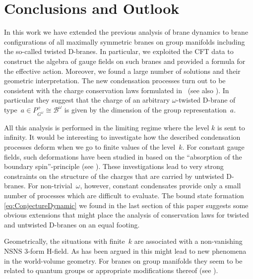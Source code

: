\documentclass[12pt,a4paper]{article}
\newcommand{\mc}{\mathcal} %
\def\iG{G^\omega} %
\def\bL{\mc{B}} %
\def\reps{P^+} %
\def\treps{\bL^\omega} %
\begin{document}
\section{Conclusions and Outlook}

In this work we have extended the previous analysis of brane 
dynamics \cite{Alekseev:1999bs,Alekseev:2000fd,Alekseev:2000wg} 
to brane configurations of all maximally symmetric branes on 
group manifolds including the so-called twisted D-branes. In 
particular, we exploited the CFT data to construct the algebra 
of gauge fields on such branes and provided a formula for the 
effective action. Moreover, we found a large number of solutions 
and their geometric interpretation. The new condensation processes 
turn out to be consistent with the charge conservation laws 
formulated in~\cite{Fredenhagen:2000ei} (see also 
\cite{Maldacena:2001xj}). In particular they suggest that the charge 
of an arbitrary $\omega$-twisted D-brane of type~$a\in\reps_{\iG}
\cong\treps$ is given by the dimension of the group 
representation~$a$.
\medskip 

All this analysis is performed in the limiting regime where 
the level $k$ is sent to infinity. It would be interesting to 
investigate how the described condensation processes deform 
when we go to finite values of the level~$k$. For constant
gauge fields, such deformations have been studied in 
\cite{Alekseev:2000jx,Fredenhagen:2000ei} based on the 
``absorption of the boundary spin''-principle (see 
\cite{Affleck:1991by,Affleck:1991iv}). These investigations 
lead to very strong constraints on the structure of the charges 
that are carried by untwisted D-branes. For non-trivial~$\omega$, 
however, constant condensates provide only a small number of 
processes which are difficult to evaluate. The bound state 
formation \eqref{eq:ConjectureDynamic} we found in the last 
section of this paper suggests some obvious extensions that 
might place the analysis of conservation laws for twisted and 
untwisted D-branes on an equal footing. 

Geometrically, the situations with finite~$k$ are associated 
with a non-vanishing NSNS 3-form H-field. As has been argued 
in \cite{Alekseev:1999bs,Cornalba:2001sm,Hayasaka:2001an} 
this might lead to new phenomena in the world-volume geometry.
For branes on group manifolds they seem to be related to 
quantum groups or appropriate modifications thereof 
(see \cite{Alekseev:1999bs,Alekseev:1995rn,Pawelczyk:2002kd}). 
\medskip
\end{document}
